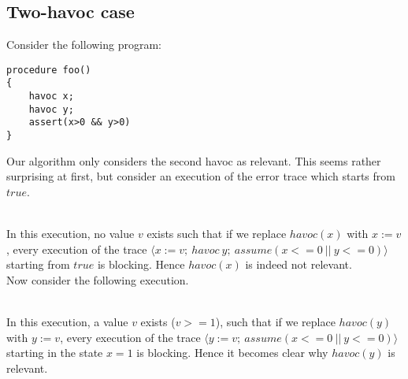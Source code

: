 \documentclass{article}
\newcommand{\trace}[1]{\ensuremath{\langle #1 \rangle}\xspace} %
\begin{document}
\subsection{Two-havoc case}
Consider the following program:
\begin{lstlisting}
procedure foo()
{
	havoc x;
	havoc y;
	assert(x>0 && y>0)
}
\end{lstlisting}
Our algorithm only considers the second havoc as relevant. This seems rather surprising at first, but consider an execution of the error trace which starts from $true$.\\
\\
In this execution, no value $v$ exists such that if we replace $havoc(x)$ with $x:=v$, every execution of the trace $\trace{x:=v;\ havoc\ y;\ assume(x<=0\ ||\ y<=0)}$ starting from $true$ is blocking. Hence $havoc( x)$ is indeed not relevant.\\
Now consider the following execution.\\
\\
In this execution, a value $v$ exists ($v>=1$), such that if we replace $havoc(y)$ with $y:=v$, every execution of the trace $\trace{y:=v;\ assume(x<=0\ ||\ y<=0)}$ starting in the state $x=1$ is blocking. Hence it becomes clear why $havoc(y)$ is relevant.
\end{document}
